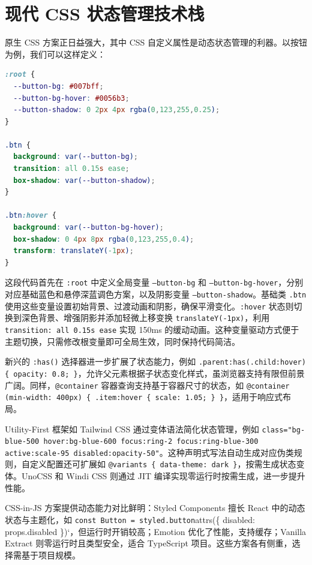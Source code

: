 \chapter{现代 CSS 状态管理技术栈}
原生 CSS 方案正日益强大，其中 CSS 自定义属性是动态状态管理的利器。以按钮为例，我们可以这样定义：\par
\begin{lstlisting}[language=css]
:root {
  --button-bg: #007bff;
  --button-bg-hover: #0056b3;
  --button-shadow: 0 2px 4px rgba(0,123,255,0.25);
}

.btn {
  background: var(--button-bg);
  transition: all 0.15s ease;
  box-shadow: var(--button-shadow);
}

.btn:hover {
  background: var(--button-bg-hover);
  box-shadow: 0 4px 8px rgba(0,123,255,0.4);
  transform: translateY(-1px);
}
\end{lstlisting}
这段代码首先在 \texttt{:root} 中定义全局变量 \texttt{--button-bg} 和 \texttt{--button-bg-hover}，分别对应基础蓝色和悬停深蓝调色方案，以及阴影变量 \texttt{--button-shadow}。基础类 \texttt{.btn} 使用这些变量设置初始背景、过渡动画和阴影，确保平滑变化。\texttt{:hover} 状态则切换到深色背景、增强阴影并添加轻微上移变换 \texttt{translateY(-1px)}，利用 \texttt{transition: all 0.15s ease} 实现 150ms 的缓动动画。这种变量驱动方式便于主题切换，只需修改根变量即可全局生效，同时保持代码简洁。\par
新兴的 \texttt{:has()} 选择器进一步扩展了状态能力，例如 \texttt{.parent:has(.child:hover) \{{} opacity: 0.8; \}{}}，允许父元素根据子状态变化样式，虽浏览器支持有限但前景广阔。同样，\texttt{@container} 容器查询支持基于容器尺寸的状态，如 \texttt{@container (min-width: 400px) \{{} .item:hover \{{} scale: 1.05; \}{} \}{}}，适用于响应式布局。\par
Utility-First 框架如 Tailwind CSS 通过变体语法简化状态管理，例如 \texttt{class="bg-blue-500 hover:bg-blue-600 focus:ring-2 focus:ring-blue-300 active:scale-95 disabled:opacity-50"}。这种声明式写法自动生成对应伪类规则，自定义配置还可扩展如 \texttt{@variants \{{} data-theme: dark \}{}}，按需生成状态变体。UnoCSS 和 Windi CSS 则通过 JIT 编译实现零运行时按需生成，进一步提升性能。\par
CSS-in-JS 方案提供动态能力对比鲜明：Styled Components 擅长 React 中的动态状态与主题化，如 \texttt{const Button = styled.button}attrs(\{{} disabled: props.disabled \}{})`，但运行时开销较高；Emotion 优化了性能，支持缓存；Vanilla Extract 则零运行时且类型安全，适合 TypeScript 项目。这些方案各有侧重，选择需基于项目规模。\par
